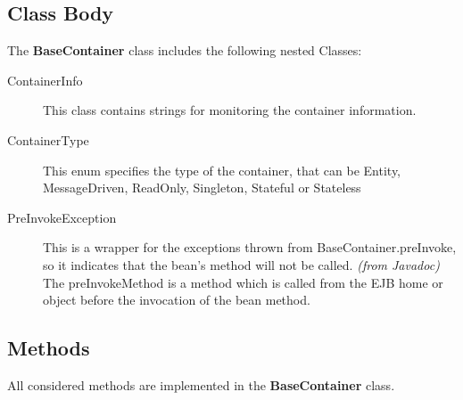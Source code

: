 \documentclass[11pt, a4paper,titlepage]{article}
\begin{document}
	 \subsection{Class Body}
	 The \textbf{BaseContainer} class includes the following nested Classes:
			\begin{description}
				\item[ContainerInfo] This class contains strings for monitoring the container information.
				\item[ContainerType] This enum specifies the type of the container, that can be Entity, MessageDriven, ReadOnly, Singleton, Stateful or Stateless
				\item[PreInvokeException] This is a wrapper for the exceptions thrown from BaseContainer.preInvoke, so it indicates that the bean's method will not be called. \textit{(from Javadoc)}
				The preInvokeMethod is a method which is called from the EJB home or object before the invocation of the bean method.
			\end{description}
	\newpage
	 \subsection{Methods}
	 All considered methods are implemented in the \textbf{BaseContainer} class. 
\end{document}
